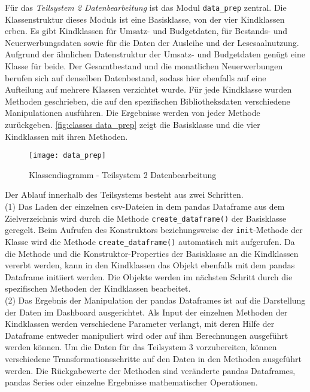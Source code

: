     Für das \textit{Teilsystem 2 Datenbearbeitung} ist das Modul \texttt{data\_prep} zentral. Die Klassenstruktur dieses Moduls ist eine 
    Basisklasse, von der vier Kindklassen erben. Es gibt Kindklassen für Umsatz- und Budgetdaten, für Bestands- und Neuerwerbungsdaten sowie für die Daten der Ausleihe und 
    der Lesesaalnutzung. Aufgrund der ähnlichen Datenstruktur der Umsatz- und Budgetdaten genügt eine Klasse für beide.
    Der Gesamtbestand und die monatlichen Neuerwerbungen berufen sich auf denselben Datenbestand, sodass hier ebenfalls auf eine Aufteilung auf mehrere Klassen verzichtet wurde.
    Für jede Kindklasse wurden Methoden geschrieben, die auf den spezifischen Bibliotheksdaten verschiedene Manipulationen ausführen.
    Die Ergebnisse werden von jeder Methode zurückgeben. \autoref{fig:classes data_prep} zeigt die Basisklasse und die vier Kindklassen mit ihren Methoden.


    \begin{figure}[H]
        \centering
            \texttt{[image: data\_prep]}
            \caption{Klassendiagramm - Teilsystem 2 Datenbearbeitung}
            \label{fig:classes data_prep}
    \end{figure}

    Der Ablauf innerhalb des Teilsystems besteht aus zwei Schritten.\\
    (1) Das Laden der einzelnen csv-Dateien in dem pandas Dataframe aus dem Zielverzeichnis wird durch die Methode \texttt{create\_dataframe()} der Basisklasse geregelt.
    Beim Aufrufen des Konstruktors beziehungsweise der \texttt{init}-Methode der Klasse wird die Methode \texttt{create\_dataframe()} 
    automatisch mit aufgerufen. Da die Methode und die Konstruktor-Properties der Basisklasse an die Kindklassen vererbt werden, kann in den Kindklassen das Objekt ebenfalls mit dem 
    pandas Dataframe initiiert werden. Die Objekte werden im nächsten Schritt durch die spezifischen Methoden der Kindklassen bearbeitet.\\
    (2) Das Ergebnis der Manipulation der pandas Dataframes ist auf die Darstellung der Daten im Dashboard ausgerichtet. Als Input der einzelnen Methoden der
    Kindklassen werden verschiedene Parameter verlangt, mit deren Hilfe der Dataframe entweder manipuliert wird oder auf ihm Berechnungen ausgeführt werden können. 
    Um die Daten für das Teilsystem 3 vorzubereiten, können verschiedene Transformationsschritte auf den Daten in den Methoden ausgeführt werden. 
    Die Rückgabewerte der Methoden sind veränderte pandas Dataframes, pandas Series oder einzelne Ergebnisse mathematischer Operationen.
    
